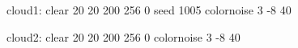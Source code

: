 cloud1:
	clear 20 20 200 256 0
	seed 1005
	colornoise 3 -8 40

cloud2:
	clear 20 20 200 256 0
	colornoise 3 -8 40

